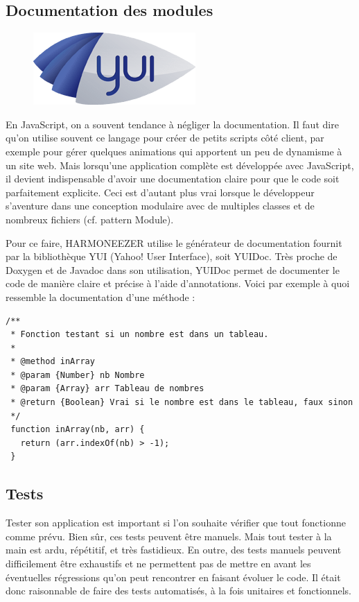 \documentclass[a4paper,12pt]{article}
\begin{document}
\subsection{Documentation des modules}

\begin{figure}[!h]
  \begin{center}
    \includegraphics[scale=0.5]{logo-yuidoc.png}
  \end{center}
\end{figure}

En JavaScript, on a souvent tendance à négliger la documentation. Il faut dire qu'on utilise souvent ce langage pour créer de petits scripts côté client, par exemple pour gérer quelques animations qui apportent un peu de dynamisme à un site web. Mais lorsqu'une application complète est développée avec JavaScript, il devient indispensable d'avoir une documentation claire pour que le code soit parfaitement explicite. Ceci est d'autant plus vrai lorsque le développeur s'aventure dans une conception modulaire avec de multiples classes et de nombreux fichiers (cf. pattern Module).

Pour ce faire, HARMONEEZER utilise le générateur de documentation fournit par la bibliothèque YUI (Yahoo! User Interface), soit YUIDoc. Très proche de Doxygen et de Javadoc dans son utilisation, YUIDoc permet de documenter le code de manière claire et précise à l'aide d'annotations. Voici par exemple à quoi ressemble la documentation d'une méthode :

\begin{lstlisting}
/**
 * Fonction testant si un nombre est dans un tableau.
 *
 * @method inArray
 * @param {Number} nb Nombre
 * @param {Array} arr Tableau de nombres
 * @return {Boolean} Vrai si le nombre est dans le tableau, faux sinon
 */
 function inArray(nb, arr) {
   return (arr.indexOf(nb) > -1);
 }
\end{lstlisting}

\subsection{Tests}

Tester son application est important si l'on souhaite vérifier que tout fonctionne comme prévu. Bien sûr, ces tests peuvent être manuels. Mais tout tester à la main est ardu, répétitif, et très fastidieux. En outre, des tests manuels peuvent difficilement être exhaustifs et ne permettent pas de mettre en avant les éventuelles régressions qu'on peut rencontrer en faisant évoluer le code. Il était donc raisonnable de faire des tests automatisés, à la fois unitaires et fonctionnels.
\end{document}
